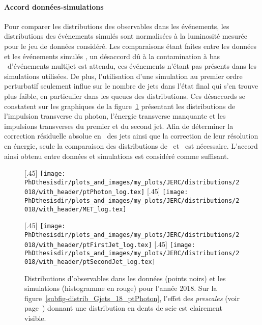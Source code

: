 \paragraph{Accord données-simulations}
Pour comparer les distributions des observables dans les événements, les distributions des événements simulés sont normalisées à la luminosité mesurée pour le jeu de données considéré.
Les comparaisons étant faites entre les données et les événements simulés \Gjets, un désaccord dû à la contamination à bas \pT\ d'événements multijet est attendu, ces événements n'étant pas présents dans les simulations utilisées.
De plus, l'utilisation d'une simulation au premier ordre perturbatif seulement influe sur le nombre de jets dans l'état final qui s'en trouve plus faible, en particulier dans les queues des distributions.
Ces désaccords se constatent sur les graphiques de la figure~\ref{fig-distribs_Gjets_18} présentant les distributions de l'impulsion transverse du photon, l'énergie transverse manquante et les impulsions transverses du premier et du second jet.
Afin de déterminer la correction résiduelle absolue en \pT\ des jets ainsi que la correction de leur résolution en énergie, seule la comparaison des distributions de \Rbal\ et \RMPF\ est nécessaire.
L'accord ainsi obtenu entre données et simulations est considéré comme suffisant.
\begin{figure}[h]
\centering
{}[.45\textwidth]
{\texttt{[image: \\PhDthesisdir/plots\_and\_images/my\_plots/JERC/distributions/2018/with\_header/ptPhoton\_log.tex]}}
\hfill
{}[.45\textwidth]
{\texttt{[image: \\PhDthesisdir/plots\_and\_images/my\_plots/JERC/distributions/2018/with\_header/MET\_log.tex]}}

\vspace{\baselineskip}

[.45\textwidth]
{\texttt{[image: \\PhDthesisdir/plots\_and\_images/my\_plots/JERC/distributions/2018/with\_header/ptFirstJet\_log.tex]}}
\hfill
{}[.45\textwidth]
{\texttt{[image: \\PhDthesisdir/plots\_and\_images/my\_plots/JERC/distributions/2018/with\_header/ptSecondJet\_log.tex]}}

\caption[Observables d'événements \Gjets\ en 2018.]{Distributions d'observables dans les données (points noirs) et les simulations (histogramme en rouge) pour l'année 2018. Sur la figure~\ref{subfig-distrib_Gjets_18_ptPhoton}, l'effet des \emph{prescales} (voir page~\pageref{tab-HLT_pT_precales_18_and_17UL}) donnant une distribution en dents de scie est clairement visible.}
\label{fig-distribs_Gjets_18}
\end{figure}
